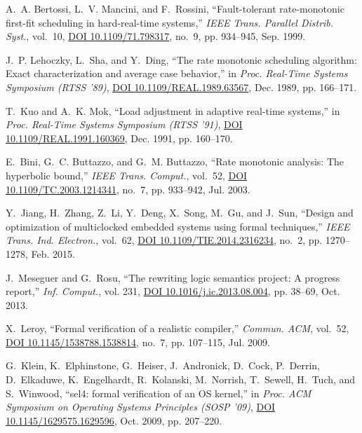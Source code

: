 \documentclass[12pt,onecolumn]{IEEEtranTIE}
\begin{document}
\begin{thebibliography}{10}
A.~A. Bertossi, L.~V. Mancini, and F.~Rossini, ``Fault-tolerant rate-monotonic
  first-fit scheduling in hard-real-time systems,'' \emph{{IEEE} Trans.
  Parallel Distrib. Syst.}, vol.~10,
  \href{http://dx.doi.org/10.1109/71.798317}{DOI 10.1109/71.798317}, no.~9, pp.
  934--945, Sep. 1999.

J.~P. Lehoczky, L.~Sha, and Y.~Ding, ``The rate monotonic scheduling algorithm:
  Exact characterization and average case behavior,'' in \emph{Proc. Real-Time
  Systems Symposium ({RTSS} '89)},
  \href{http://dx.doi.org/10.1109/REAL.1989.63567}{DOI
  10.1109/REAL.1989.63567}, Dec. 1989, pp. 166--171.

T.~Kuo and A.~K. Mok, ``Load adjustment in adaptive real-time systems,'' in
  \emph{Proc. Real-Time Systems Symposium ({RTSS} '91)},
  \href{http://dx.doi.org/10.1109/REAL.1991.160369}{DOI
  10.1109/REAL.1991.160369}, Dec. 1991, pp. 160--170.

E.~Bini, G.~C. Buttazzo, and G.~M. Buttazzo, ``Rate monotonic analysis: The
  hyperbolic bound,'' \emph{{IEEE} Trans. Comput.}, vol.~52,
  \href{http://dx.doi.org/10.1109/TC.2003.1214341}{DOI
  10.1109/TC.2003.1214341}, no.~7, pp. 933--942, Jul. 2003.

Y.~Jiang, H.~Zhang, Z.~Li, Y.~Deng, X.~Song, M.~Gu, and J.~Sun, ``Design and
  optimization of multiclocked embedded systems using formal techniques,''
  \emph{{IEEE} Trans. Ind. Electron.}, vol.~62,
  \href{http://dx.doi.org/10.1109/TIE.2014.2316234}{DOI
  10.1109/TIE.2014.2316234}, no.~2, pp. 1270--1278, Feb. 2015.

J.~Meseguer and G.~Rosu, ``The rewriting logic semantics project: A progress
  report,'' \emph{Inf. Comput.}, vol. 231,
  \href{http://dx.doi.org/10.1016/j.ic.2013.08.004}{DOI
  10.1016/j.ic.2013.08.004}, pp. 38--69, Oct. 2013.

X.~Leroy, ``Formal verification of a realistic compiler,'' \emph{Commun.
  {ACM}}, vol.~52, \href{http://dx.doi.org/10.1145/1538788.1538814}{DOI
  10.1145/1538788.1538814}, no.~7, pp. 107--115, Jul. 2009.

G.~Klein, K.~Elphinstone, G.~Heiser, J.~Andronick, D.~Cock, P.~Derrin,
  D.~Elkaduwe, K.~Engelhardt, R.~Kolanski, M.~Norrish, T.~Sewell, H.~Tuch, and
  S.~Winwood, ``sel4: formal verification of an {OS} kernel,'' in \emph{Proc.
  {ACM} Symposium on Operating Systems Principles ({SOSP} '09)},
  \href{http://dx.doi.org/10.1145/1629575.1629596}{DOI
  10.1145/1629575.1629596}, Oct. 2009, pp. 207--220.


\end{thebibliography}
\end{document}
